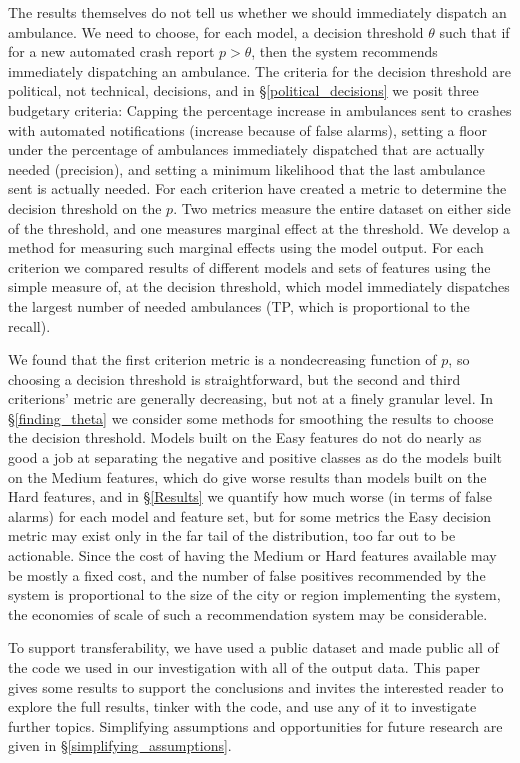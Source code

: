 The results themselves do not tell us whether we should immediately dispatch an ambulance.  We need to choose, for each model, a decision threshold $\theta$ such that if for a new automated crash report $p>\theta$, then the system recommends immediately dispatching an ambulance.  The criteria for the decision threshold are political, not technical, decisions, and in \S \ref{political_decisions} we posit three budgetary criteria:  Capping the percentage increase in ambulances sent to crashes with automated notifications (increase because of false alarms), setting a floor under the percentage of ambulances immediately dispatched that are actually needed (precision), and setting a minimum likelihood that the last ambulance sent is actually needed.  For each criterion have created a metric to determine the decision threshold on the $p$.  Two metrics measure the entire dataset on either side of the threshold, and one measures marginal effect at the threshold.  We develop a method for measuring such marginal effects using the model output. For each criterion we compared results of different models and sets of features using the simple measure of, at the decision threshold, which model immediately dispatches the largest number of needed ambulances (TP, which is proportional to the recall).  

We found that the first criterion metric is a nondecreasing function of $p$, so choosing a decision threshold is straightforward, but the second and third criterions' metric are generally decreasing, but not at a finely granular level.  In \S \ref{finding_theta} we consider some methods for smoothing the results to choose the decision threshold.  Models built on the Easy features do not do nearly as good a job at separating the negative and positive classes as do the models built on the Medium features, which do give worse results than models built on the Hard features, and in \S \ref{Results} we quantify how much worse (in terms of false alarms) for each model and feature set, but for some metrics the Easy decision metric may exist only in the far tail of the distribution, too far out to be actionable.  Since the cost of having the Medium or Hard features available may be mostly a fixed cost, and the number of false positives recommended by the system is proportional to the size of the city or region implementing the system, the economies of scale of such a recommendation system may be considerable.  

To support transferability, we have used a public dataset and made public all of the code we used in our investigation with all of the output data.  This paper gives some results to support the conclusions and invites the interested reader to explore the full results, tinker with the code, and use any of it to investigate further topics.  Simplifying assumptions and opportunities for future research are given in \S \ref{simplifying_assumptions}.








